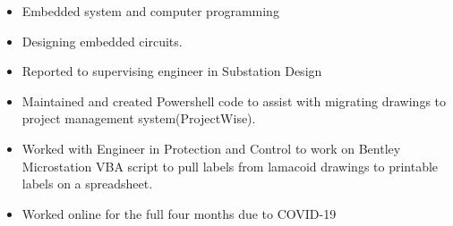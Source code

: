 \documentclass[10pt,a4paper,ragged2e]{altacv}
\begin{document}

\begin{fullwidth}
\makecvheader
\end{fullwidth}


\begin{itemize}
\item Embedded system and computer programming
\item Designing embedded circuits.
\end{itemize}


\begin{itemize}
\item Reported to supervising engineer in Substation Design
\item Maintained and created Powershell code to assist with migrating drawings to project management system(ProjectWise).
\item Worked with Engineer in Protection and Control to work on Bentley Microstation VBA script to pull labels from lamacoid drawings to printable labels on a spreadsheet.
\item Worked online for the full four months due to COVID-19
\end{itemize}
\end{document}
